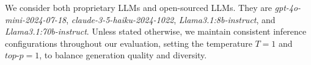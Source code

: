 

 We consider both proprietary LLMs and open-sourced LLMs. They are \textit{gpt-4o-mini-2024-07-18}, \textit{claude-3-5-haiku-2024-1022}, \textit{Llama3.1:8b-instruct}, and \textit{Llama3.1:70b-instruct}.
Unless stated otherwise, we maintain consistent inference configurations throughout our evaluation, setting the temperature $T=1$ and $top\text{-}p=1$, to balance generation quality and diversity.

